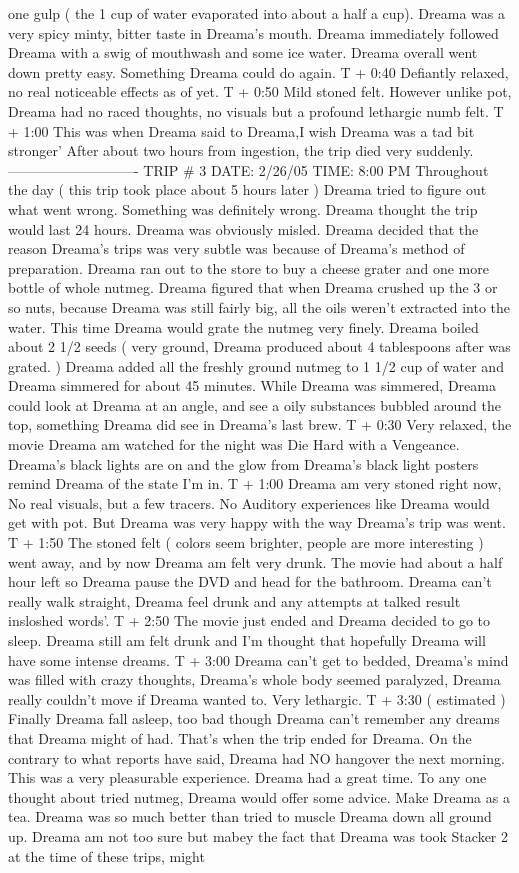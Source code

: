 \documentclass[12pt]{book}
\begin{document}
one gulp ( the 1 cup of water evaporated into about a half a cup). Dreama was a very spicy minty, bitter taste in Dreama's mouth. Dreama immediately followed Dreama with a swig of mouthwash and some ice water. Dreama overall went down pretty easy. Something Dreama could do again. T + 0:40 Defiantly relaxed, no real noticeable effects as of yet. T + 0:50 Mild stoned felt. However unlike pot, Dreama had no raced thoughts, no visuals but a profound lethargic numb felt. T + 1:00 This was when Dreama said to Dreama,I wish Dreama was a tad bit stronger' After about two hours from ingestion, the trip died very suddenly. ---------------------------- TRIP \# 3 DATE: 2/26/05 TIME: 8:00 PM Throughout the day ( this trip took place about 5 hours later ) Dreama tried to figure out what went wrong. Something was definitely wrong. Dreama thought the trip would last 24 hours. Dreama was obviously misled. Dreama decided that the reason Dreama's trips was very subtle was because of Dreama's method of preparation. Dreama ran out to the store to buy a cheese grater and one more bottle of whole nutmeg. Dreama figured that when Dreama crushed up the 3 or so nuts, because Dreama was still fairly big, all the oils weren't extracted into the water. This time Dreama would grate the nutmeg very finely. Dreama boiled about 2 1/2 seeds ( very ground, Dreama produced about 4 tablespoons after was grated. ) Dreama added all the freshly ground nutmeg to 1 1/2 cup of water and Dreama simmered for about 45 minutes. While Dreama was simmered, Dreama could look at Dreama at an angle, and see a oily substances bubbled around the top, something Dreama did see in Dreama's last brew. T + 0:30 Very relaxed, the movie Dreama am watched for the night was Die Hard with a Vengeance. Dreama's black lights are on and the glow from Dreama's black light posters remind Dreama of the state I'm in. T + 1:00 Dreama am very stoned right now, No real visuals, but a few tracers. No Auditory experiences like Dreama would get with pot. But Dreama was very happy with the way Dreama's trip was went. T + 1:50 The stoned felt ( colors seem brighter, people are more interesting ) went away, and by now Dreama am felt very drunk. The movie had about a half hour left so Dreama pause the DVD and head for the bathroom. Dreama can't really walk straight, Dreama feel drunk and any attempts at talked result insloshed words'. T + 2:50 The movie just ended and Dreama decided to go to sleep. Dreama still am felt drunk and I'm thought that hopefully Dreama will have some intense dreams. T + 3:00 Dreama can't get to bedded, Dreama's mind was filled with crazy thoughts, Dreama's whole body seemed paralyzed, Dreama really couldn't move if Dreama wanted to. Very lethargic. T + 3:30 ( estimated ) Finally Dreama fall asleep, too bad though Dreama can't remember any dreams that Dreama might of had. That's when the trip ended for Dreama. On the contrary to what reports have said, Dreama had NO hangover the next morning. This was a very pleasurable experience. Dreama had a great time. To any one thought about tried nutmeg, Dreama would offer some advice. Make Dreama as a tea. Dreama was so much better than tried to muscle Dreama down all ground up. Dreama am not too sure but mabey the fact that Dreama was took Stacker 2 at the time of these trips, might 
\end{document}

